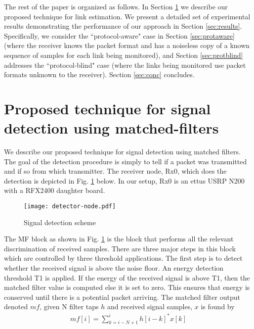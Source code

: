 \documentclass[journal]{IEEEtran}
\begin{document}
The rest of the paper is organized as follows. In Section \ref{sec:mf} we
describe our proposed technique for link estimation. We present a detailed set
of experimental results demonstrating the performance of our approach in
Section \ref{sec:results}. Specifically, we consider the ``protocol-aware" case
in Section \ref{sec:protaware} (where the receiver knows the packet format and
has a noiseless copy of a known sequence of samples for each link being
monitored), and Section \ref{sec:protblind} addresses the ``protocol-blind"
case (where the links being monitored use packet formats unknown to the
receiver). Section \ref{sec:conc} concludes.

\section{Proposed technique for signal detection using matched-filters}
\label{sec:mf}

We describe our proposed technique for signal detection using matched filters. The goal of the detection procedure is simply to tell if a packet was transmitted and if so from which transmitter. The receiver node, Rx0, which does the detection is depicted in Fig. \ref{fig:detector-node} below. In our setup, Rx0 is an ettus USRP N200 with a RFX2400 daughter board. 

\begin{figure}[htb]
\begin{center}
	\texttt{[image: detector-node.pdf]} 
\caption{Signal detection scheme}
\label{fig:detector-node}
\end{center}
\end{figure}

The MF block as shown in Fig. \ref{fig:detector-node} is the block that performs all the relevant discrimination of received samples. There are three major steps in this block which are controlled by three threshold applications. The first step is to detect whether the received signal is above the noise floor. An energy detection threshold T1 is applied. If the energy of the received signal is above T1, then the matched filter value is computed else it is set to zero. This ensures that energy is conserved until there is a potential packet arriving. The matched filter output denoted $mf$, given N filter taps $h$ and received signal samples, $x$ is found by
\begin{align}
{mf[i]} = \sum_{k=i-N+1}^i h[i-k]^*x[k] \label{eq:mf1}
\end{align}
\end{document}

